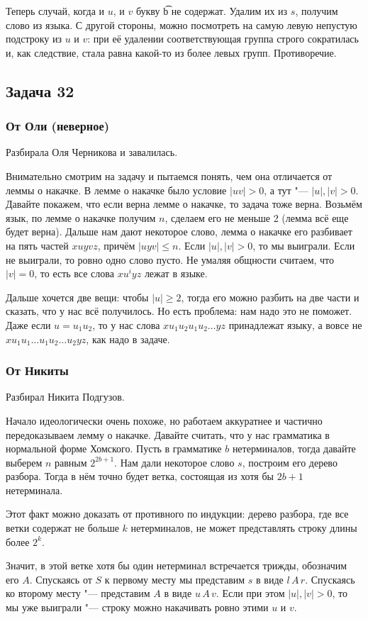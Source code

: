 	Теперь случай, когда и $u$, и $v$ букву \t{b} не содержат.
	Удалим их из $s$, получим слово из языка.
	С другой стороны, можно посмотреть на самую левую непустую подстроку из $u$ и $v$:
	при её удалении соответствующая группа строго сократилась и, как следствие, стала равна какой-то
	из более левых групп.
	Противоречие.

\subsection{Задача 32}
	\subsubsection{От Оли (неверное)}
		Разбирала Оля Черникова и завалилась.

		Внимательно смотрим на задачу и пытаемся понять, чем она отличается от леммы о накачке.
		В лемме о накачке было условие $|uv|>0$, а тут "--- $|u|, |v|>0$.
		Давайте покажем, что если верна лемме о накачке, то задача тоже верна.
		Возьмём язык, по лемме о накачке получим $n$, сделаем его не меньше 2 (лемма всё еще будет верна).
		Дальше нам дают некоторое слово, лемма о накачке его разбивает на пять частей $xuyvz$, причём $|uyv| \le n$.
		Если $|u|, |v|>0$, то мы выиграли.
		Если не выиграли, то ровно одно слово пусто.
		Не умаляя общности считаем, что $|v|=0$, то есть все слова $xu^iyz$ лежат в языке.

		Дальше хочется две вещи: чтобы $|u|\ge2$, тогда его можно разбить на две части и сказать,
		что у нас всё получилось.
		Но есть проблема: нам надо это не поможет.
		Даже если $u=u_1u_2$, то у нас слова $xu_1u_2u_1u_2\dots yz$
		принадлежат языку, а вовсе не $xu_1u_1\dots u_1u_2\dots u_2 yz$, как надо в задаче.

	\subsubsection{От Никиты}
		Разбирал Никита Подгузов.

		Начало идеологически очень похоже, но работаем аккуратнее и частично передоказываем лемму о накачке.
		Давайте считать, что у нас грамматика в нормальной форме Хомского.
		Пусть в грамматике $b$ нетерминалов, тогда давайте выберем $n$ равным $2^{2b+1}$.
		Нам дали некоторое слово $s$, построим его дерево разбора.
		Тогда в нём точно будет ветка, состоящая из хотя бы $2b+1$ нетерминала.
		\begin{Rem}
			Этот факт можно доказать от противного по индукции: дерево разбора,
			где все ветки содержат не больше $k$ нетерминалов, не может представлять
			строку длины более $2^k$.
		\end{Rem}
		Значит, в этой ветке хотя бы один нетерминал встречается трижды, обозначим его $A$.
		Спускаясь от $S$ к первому месту мы представим $s$ в виде $l\,A\,r$.
		Спускаясь ко второму месту "--- представим $A$ в виде $u\,A\,v$.
		Если при этом $|u|, |v|>0$, то мы уже выиграли "--- строку можно накачивать ровно этими $u$ и $v$.

